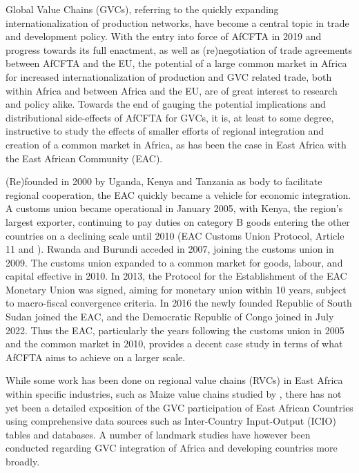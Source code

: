 \documentclass[a4paper]{article}
\begin{document}
Global Value Chains (GVCs), referring to the quickly expanding internationalization of production networks, have become a central topic in trade and development policy. With the entry into force of AfCFTA in 2019 and progress towards its full enactment, as well as (re)negotiation of trade agreements between AfCFTA and the EU, the potential of a large common market in Africa for increased internationalization of production and GVC related trade, both within Africa and between Africa and the EU, are of great interest to research and policy alike. Towards the end of gauging the potential implications and distributional side-effects of AfCFTA for GVCs, it is, at least to some degree, instructive to study the effects of smaller efforts of regional integration and creation of a common market in Africa, as has been the case in East Africa with the East African Community (EAC). \newline 

(Re)founded in 2000 by Uganda, Kenya and Tanzania as body to facilitate regional cooperation, the EAC quickly became a vehicle for economic integration. A customs union became operational in January 2005, with Kenya, the region's largest exporter, continuing to pay duties on category B goods entering the other countries on a declining scale until 2010 (EAC Customs Union Protocol, Article 11 and \citet{aloo2017free}). Rwanda and Burundi acceded in 2007, joining the customs union in 2009. The customs union expanded to a common market for goods, labour, and capital effective in 2010. In 2013, the Protocol for the Establishment of the EAC Monetary Union was signed, aiming for monetary union within 10 years, subject to macro-fiscal convergence criteria. In 2016 the newly founded Republic of South Sudan joined the EAC, and the Democratic Republic of Congo joined in July 2022. Thus the EAC, particularly the years following the customs union in 2005 and the common market in 2010, provides a decent case study in terms of what AfCFTA aims to achieve on a larger scale.  \newline


While some work has been done on regional value chains (RVCs) in East Africa within specific industries, such as Maize value chains studied by \citet{daly2016maize}, there has not yet been a detailed exposition of the GVC participation of East African Countries using comprehensive data sources such as Inter-Country Input-Output (ICIO) tables and databases. A number of landmark studies have however been conducted regarding GVC integration of Africa and developing countries more broadly. \newline
\end{document}
